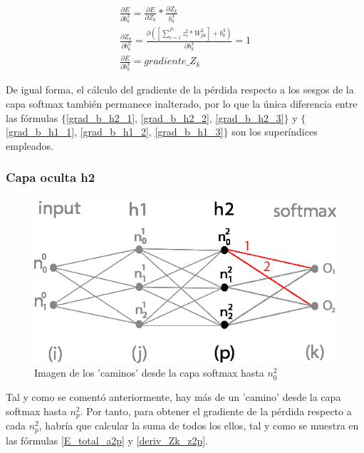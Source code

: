 \begin{gather}
	\frac{\partial E}{\partial b^3_k} = \frac{\partial E}{\partial Z_k} * \frac{\partial Z_k}{b^3_k} \label{grad_b_h2_1} \\
	\frac{\partial Z_k }{\partial b^3_k } = \frac{\partial ([\sum_{c=1}^{P} z^2_c * W^2_{pk}] + b^3_k) }{\partial b^3_k } = 1 \label{grad_b_h2_2} \\
	\frac{\partial E}{\partial b^3_k} = gradiente\_Z_k \label{grad_b_h2_3}
\end{gather}

De igual forma, el cálculo del gradiente de la pérdida respecto a los sesgos de la capa softmax también permanece inalterado, por lo que la única diferencia entre las fórmulas $\{$\ref{grad_b_h2_1}, \ref{grad_b_h2_2}, \ref{grad_b_h2_3}$\}$ y $\{$\ref{grad_b_h1_1}, \ref{grad_b_h1_2}, \ref{grad_b_h1_3}$\}$ son los superíndices empleados.

\subsubsection{Capa oculta h2}

\begin{figure}[H]
	\centering
	\includegraphics[scale=0.35]{imagenes/nn_h2_caminos_posibles.jpg}  
	\caption{Imagen de los 'caminos' desde la capa softmax hasta $n^2_0$}
	\label{nn_h2_caminos_posibles}
\end{figure}

Tal y como se comentó anteriormente, hay más de un 'camino' desde la capa softmax hasta $n^2_p$. Por tanto, para obtener el gradiente de la pérdida respecto a cada $n^2_p$, habría que calcular la suma de todos los ellos, tal y como se muestra en las fórmulas \ref{E_total_a2p} y \ref{deriv_Zk_z2p}. \\

